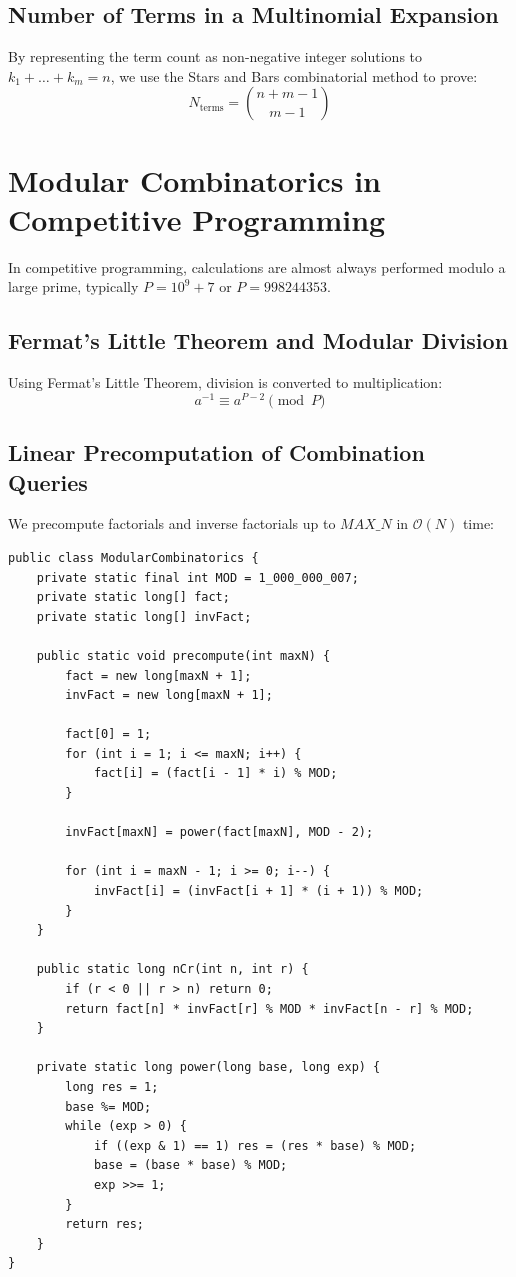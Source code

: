 \documentclass[10pt,journal,compsoc,onecolumn]{IEEEtran}
\begin{document}
\subsection{Number of Terms in a Multinomial Expansion}

By representing the term count as non-negative integer solutions to $k_1 + \dots + k_m = n$, we use the Stars and Bars combinatorial method to prove:
\begin{equation}
N_{\text{terms}} = \binom{n + m - 1}{m - 1}
\end{equation}

\section{Modular Combinatorics in Competitive Programming}
\label{sec:modular}

In competitive programming, calculations are almost always performed modulo a large prime, typically $P = 10^9+7$ or $P = 998244353$.

\subsection{Fermat's Little Theorem and Modular Division}

Using Fermat's Little Theorem, division is converted to multiplication:
\begin{equation}
a^{-1} \equiv a^{P-2} \pmod P
\end{equation}

\subsection{Linear Precomputation of Combination Queries}

We precompute factorials and inverse factorials up to $MAX\_N$ in $\mathcal{O}(N)$ time:
\begin{verbatim}
public class ModularCombinatorics {
    private static final int MOD = 1_000_000_007;
    private static long[] fact;
    private static long[] invFact;

    public static void precompute(int maxN) {
        fact = new long[maxN + 1];
        invFact = new long[maxN + 1];
        
        fact[0] = 1;
        for (int i = 1; i <= maxN; i++) {
            fact[i] = (fact[i - 1] * i) % MOD;
        }

        invFact[maxN] = power(fact[maxN], MOD - 2);

        for (int i = maxN - 1; i >= 0; i--) {
            invFact[i] = (invFact[i + 1] * (i + 1)) % MOD;
        }
    }

    public static long nCr(int n, int r) {
        if (r < 0 || r > n) return 0;
        return fact[n] * invFact[r] % MOD * invFact[n - r] % MOD;
    }

    private static long power(long base, long exp) {
        long res = 1;
        base %= MOD;
        while (exp > 0) {
            if ((exp & 1) == 1) res = (res * base) % MOD;
            base = (base * base) % MOD;
            exp >>= 1;
        }
        return res;
    }
}
\end{verbatim}
\end{document}
